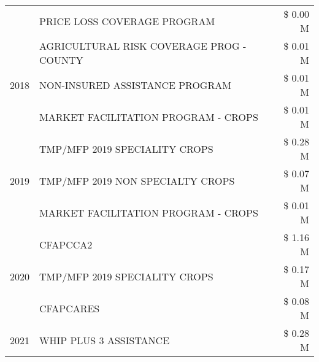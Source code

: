 \begin{tabular}{llr}
 & PRICE LOSS COVERAGE PROGRAM & \$ 0.00 M \\
\cline{1-3}
\multirow[t]{3}{*}{2018} & AGRICULTURAL RISK COVERAGE PROG - COUNTY & \$ 0.01 M \\
 & NON-INSURED ASSISTANCE PROGRAM & \$ 0.01 M \\
 & MARKET FACILITATION PROGRAM - CROPS & \$ 0.01 M \\
\cline{1-3}
\multirow[t]{3}{*}{2019} & TMP/MFP 2019 SPECIALITY CROPS & \$ 0.28 M \\
 & TMP/MFP 2019 NON SPECIALTY CROPS & \$ 0.07 M \\
 & MARKET FACILITATION PROGRAM - CROPS & \$ 0.01 M \\
\cline{1-3}
\multirow[t]{3}{*}{2020} & CFAPCCA2 & \$ 1.16 M \\
 & TMP/MFP 2019 SPECIALITY CROPS & \$ 0.17 M \\
 & CFAPCARES & \$ 0.08 M \\
\cline{1-3}
2021 & WHIP PLUS 3 ASSISTANCE & \$ 0.28 M \\
\cline{1-3}
\bottomrule
\end{tabular}
